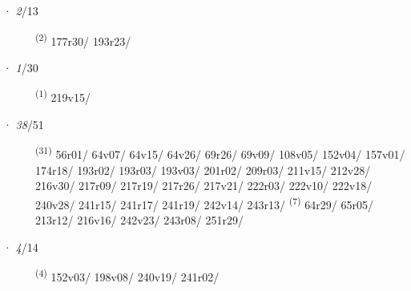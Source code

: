 \ENTRYEND
\noindent{} · \textit{2}/13 \LEMMALINE
\begin{description}
    \item[]  \textsuperscript{(2)} \mbox{177r30/} \mbox{193r23/}
\end{description}
\ENTRYEND
\noindent{} · \textit{1}/30 \LEMMALINE
\begin{description}
    \item[]  \textsuperscript{(1)} \mbox{219v15/}
\end{description}
\ENTRYEND
\noindent{} · \textit{38}/51 \LEMMALINE
\begin{description}
    \item[]  \textsuperscript{(31)} \mbox{56r01/} \mbox{64v07/} \mbox{64v15/} \mbox{64v26/} \mbox{69r26/} \mbox{69v09/} \mbox{108v05/} \mbox{152v04/} \mbox{157v01/} \mbox{174r18/} \mbox{193r02/} \mbox{193r03/} \mbox{193v03/} \mbox{201r02/} \mbox{209r03/} \mbox{211v15/} \mbox{212v28/} \mbox{216v30/} \mbox{217r09/} \mbox{217r19/} \mbox{217r26/} \mbox{217v21/} \mbox{222r03/} \mbox{222v10/} \mbox{222v18/} \mbox{240v28/} \mbox{241r15/} \mbox{241r17/} \mbox{241r19/} \mbox{242v14/} \mbox{243r13/} \CASEBREAK {} \textsuperscript{(7)} \mbox{64r29/} \mbox{65r05/} \mbox{213r12/} \mbox{216v16/} \mbox{242v23/} \mbox{243r08/} \mbox{251r29/}
\end{description}
\ENTRYEND
\noindent{} · \textit{4}/14 \LEMMALINE
\begin{description}
    \item[]  \textsuperscript{(4)} \mbox{152v03/} \mbox{198v08/} \mbox{240v19/} \mbox{241r02/}
\end{description}

